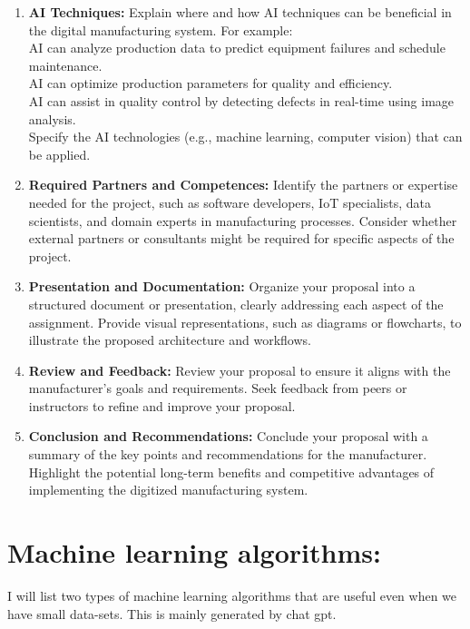 \documentclass[12pt,a4paper,twoside]{article}
\begin{document}
\begin{enumerate}
		\item \textbf{AI Techniques:} Explain where and how AI techniques can be beneficial in the digital manufacturing system. For example:
		\\
		AI can analyze production data to predict equipment failures and schedule maintenance.\\
		AI can optimize production parameters for quality and efficiency.\\
		AI can assist in quality control by detecting defects in real-time using image analysis.\\
		Specify the AI technologies (e.g., machine learning, computer vision) that can be applied.
		
		\item \textbf{Required Partners and Competences:} Identify the partners or expertise needed for the project, such as software developers, IoT specialists, data scientists, and domain experts in manufacturing processes. Consider whether external partners or consultants might be required for specific aspects of the project.
		
		\item \textbf{Presentation and Documentation:} Organize your proposal into a structured document or presentation, clearly addressing each aspect of the assignment.
		Provide visual representations, such as diagrams or flowcharts, to illustrate the proposed architecture and workflows.
		
		\item \textbf{Review and Feedback:} Review your proposal to ensure it aligns with the manufacturer's goals and requirements.
		Seek feedback from peers or instructors to refine and improve your proposal.
		
		\item \textbf{Conclusion and Recommendations:} Conclude your proposal with a summary of the key points and recommendations for the manufacturer.
		Highlight the potential long-term benefits and competitive advantages of implementing the digitized manufacturing system.
	\end{enumerate}
	\clearpage
	\section{Machine learning algorithms:}
	I will list two types of machine learning algorithms that are useful even when we have small data-sets. This is mainly generated by chat gpt.
\end{document}
